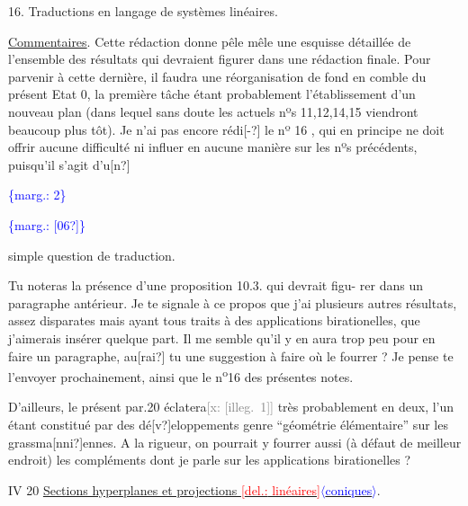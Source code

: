 \documentclass[11pt]{article}
\newcommand{\scanpage}[1]{\par\bigskip\noindent{\small\sffamily[scan #1]}\par}
\newcommand{\mspage}[1]{{\small\sffamily[p.\,#1]}}
\newcommand{\hand}[1]{\textcolor{blue}{#1}}
\newcommand{\inserted}[2][]{\textcolor{blue}{$\langle$#2$\rangle$}}
\newcommand{\margin}[1]{\textcolor{blue}{\{\textsf{marg.:} #1\}}}
\newcommand{\deleted}[1]{\textcolor{red}{[\textsf{del.:} #1]}}
\newcommand{\xout}[1]{\textcolor{gray}{[\textsf{x:} #1]}}
\newcommand{\uline}[1]{\underline{#1}}
\newcommand{\unsure}[1]{[#1?]}
\newcommand{\illegible}[1]{[\textsf{illeg.\ #1}]}
\begin{document}
16. Traductions en langage de systèmes linéaires.

\uline{Commentaires}. Cette rédaction donne pêle mêle  une esquisse détaillée
de l'ensemble des résultats qui devraient figurer dans une rédaction
finale. Pour parvenir à cette dernière, il faudra une réorganisation de
fond en comble  du présent Etat 0, la première tâche étant probablement
l'établissement d'un nouveau plan (dans lequel sans doute  les actuels
nºs 11,12,14,15  viendront beaucoup plus tôt). Je n'ai pas encore rédi\unsure{-}
le nº 16 , qui en principe ne doit offrir aucune difficulté ni
influer en aucune manière sur les nºs précédents, puisqu'il s'agit d'u\unsure{n}

\margin{2}

\clearpage
\scanpage{25/3}
\margin{\unsure{06}}

simple question de traduction.

Tu noteras la présence d'une proposition 10.3. qui devrait figu-%
rer dans un paragraphe antérieur. Je te signale à ce propos que j'ai
plusieurs autres résultats, assez disparates mais ayant tous traits à
des applications birationelles, que j'aimerais insérer quelque part.
Il me semble qu'il y en aura trop peu pour en faire un paragraphe, au\unsure{rai}
tu une suggestion à faire où le fourrer ? Je pense te l'envoyer
prochainement, ainsi que le n\textsuperscript{o}16 des présentes notes.

D'ailleurs, le présent par.20 éclatera\xout{\illegible{1}} très probablement en
deux, l'un étant constitué par des dé\unsure{v}eloppements genre ``géométrie
élémentaire'' sur les grassma\unsure{nni}ennes. A la rigueur, on pourrait y fourrer
aussi (à défaut de meilleur endroit) les compléments dont je parle sur
les applications birationelles ?

\mspage{\hand{3}}

\clearpage
\scanpage{25/4}
IV 20 \quad \uline{Sections hyperplanes et projections \deleted{linéaires}\inserted{coniques}}.
\end{document}
